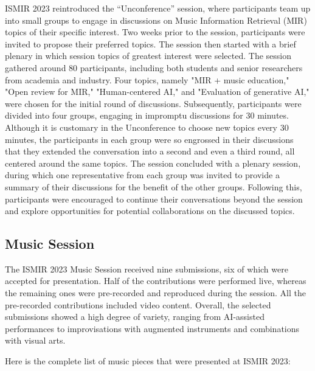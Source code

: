 ISMIR 2023 reintroduced the ``Unconference'' session, where participants team up into  small groups to engage in discussions on Music Information Retrieval (MIR) topics of their specific interest.
Two weeks prior to the session, participants were invited to propose their preferred topics.
The session then started with a brief plenary in which session topics of greatest interest were selected. 
The session gathered around 80 participants, including both students and senior researchers from academia and industry.
Four topics, namely "MIR + music education," "Open review for MIR," "Human-centered AI," and "Evaluation of generative AI," were chosen for the initial round of discussions. 
Subsequently, participants were divided into four groups, engaging in impromptu discussions for 30 minutes.
Although it is customary in the Unconference to choose new topics every 30 minutes, the participants in each group were so engrossed in their discussions that they extended the conversation into a second and even a third round, all centered around the same topics.
The session concluded with a plenary session, during which one representative from each group was invited to provide a summary of their discussions for the benefit of the other groups. Following this, participants were encouraged to continue their conversations beyond the session and explore opportunities for potential collaborations on the discussed topics.

\subsection*{Music Session}

The ISMIR 2023 Music Session received nine submissions, six of which were accepted for presentation. Half of the contributions were performed live, whereas the remaining ones were pre-recorded and reproduced during the session. All the pre-recorded contributions included video content. 
Overall, the selected submissions showed a high degree of variety, ranging from AI-assisted performances to improvisations with augmented instruments and combinations with visual arts.

Here is the complete list of music pieces that were presented at ISMIR 2023:


